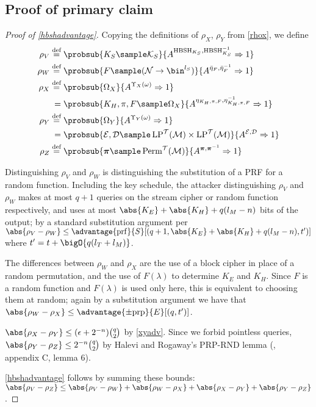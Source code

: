 \documentclass[eprint.tex]{subfiles}
\begin{document}
\subsection{Proof of primary claim}
\begin{proof}[Proof of \autoref{hbshadvantage}]\label{hbshproof}
    Copying the definitions of $\rho_X$, $\rho_Y$ from \autoref{rhox},
    we define
    \begin{align*}
        \rho_V \defeq{}& \probsub{K_S \sample \mathcal{K}_S}
            {A^{\HBSH_{K_S}, \HBSH_{K_S}^{-1}}\Rightarrow 1} \\
        \rho_W \defeq{}& \probsub{F \sample (\mathcal{N} \rightarrow \bin^{l_S})}
            {A^{\bar{\eta}_{F}, \bar{\eta}_{F}^{-1}}\Rightarrow 1} \\
        \rho_X \defeq{}& \probsub{\Omega_X}{A^{\Upsilon_X(\omega)} \Rightarrow 1} \\
            ={}&\probsub{K_H, \pi, F \sample \Omega_X}{A^{\eta_{K_H, \pi, F}, \eta_{K_H, \pi, F}^{-1}} \Rightarrow 1} \\
        \rho_Y \defeq{}& \probsub{\Omega_Y}{A^{\Upsilon_Y(\omega)} \Rightarrow 1} \\
            ={}&\probsub{\mathcal{E}, \mathcal{D} \sample \LP^\mathcal{T}(\mathcal{M}) \times \LP^\mathcal{T}(\mathcal{M})}{A^{\mathcal{E}, \mathcal{D}} \Rightarrow 1} \\
        \rho_Z \defeq{}& \probsub{\bm{\pi} \sample \Perm^\mathcal{T}(\mathcal{M})}
            {A^{\bm{\pi},\bm{\pi}^{-1}}\Rightarrow 1} \\
    \end{align*}

    Distinguishing
    $\rho_V$ and $\rho_W$ is distinguishing the substitution of a PRF
    for a random function.
    Including the key schedule, the attacker distinguishing
    $\rho_V$ and $\rho_W$ makes at most $q + 1$ queries on the stream cipher
    or random function respectively, and uses at most $\abs{K_E} + \abs{K_H} + q(l_M - n)$ bits
    of the output; by a standard substitution argument per \cite{cbcsec,concsym}
    $\abs{\rho_V - \rho_W} \leq
    \advantage{\mathrm{prf}}{S}[(q + 1, \abs{K_E} + \abs{K_H} + q(l_M - n), t')]$
    where $t' = t + \bigO{q(l_T + l_M)}$.

    The differences between $\rho_W$ and $\rho_X$ are the use of a block cipher
    in place of a random permutation, and the use of $F(\lambda)$ to determine
    $K_E$ and $K_H$. Since $F$ is a random function and $F(\lambda)$ is used
    only here, this is equivalent to choosing them at random; again by a substitution
    argument we have that $\abs{\rho_W - \rho_X} \leq \advantage{\pm \mathrm{prp}}{E}[(q, t')]$.

    $\abs{\rho_X - \rho_Y} \leq (\epsilon + 2^{-n})\binom{q}{2}$ by \autoref{xyadv}.
    Since we forbid pointless queries,
    $\abs{\rho_Y - \rho_Z} \leq 2^{-n}\binom{q}{2}$ by Halevi and Rogaway's PRP-RND lemma
    (\cite{cmc}, appendix C, lemma 6).

    \autoref{hbshadvantage} follows by summing these bounds:
    $\abs{\rho_V - \rho_Z} \leq
    \abs{\rho_V - \rho_W} + \abs{\rho_W - \rho_X} + \abs{\rho_X - \rho_Y} + \abs{\rho_Y - \rho_Z}$.
\end{proof}

\subbib
\end{document}
